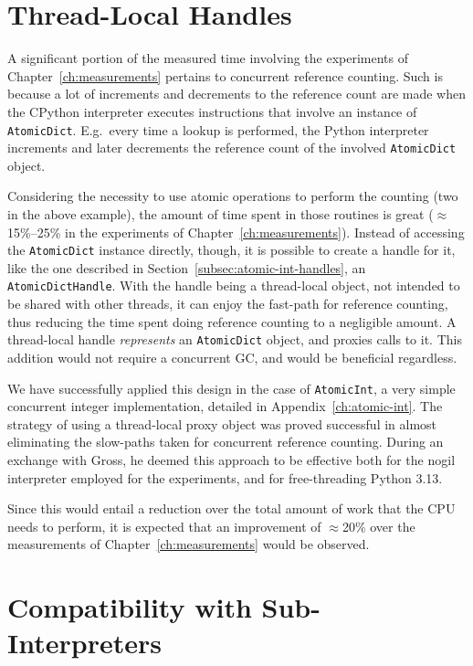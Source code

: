 \section{Thread-Local Handles}\label{sec:atomicdicthandle}

A significant portion of the measured time involving the experiments of Chapter~\ref{ch:measurements} pertains to concurrent reference counting.
Such is because a lot of increments and decrements to the reference count are made when the CPython interpreter executes instructions that involve an instance of \texttt{AtomicDict}.
E.g.\ every time a lookup is performed, the Python interpreter increments and later decrements the reference count of the involved \texttt{AtomicDict} object.

Considering the necessity to use atomic operations to perform the counting (two in the above example), the amount of time spent in those routines is great ($\approx$15\%--25\% in the experiments of Chapter~\ref{ch:measurements}).
Instead of accessing the \texttt{AtomicDict} instance directly, though, it is possible to create a handle for it, like the one described in Section~\ref{subsec:atomic-int-handles}, an \texttt{AtomicDictHandle}.
With the handle being a thread-local object, not intended to be shared with other threads, it can enjoy the fast-path for reference counting, thus reducing the time spent doing reference counting to a negligible amount.
A thread-local handle \emph{represents} an \texttt{AtomicDict} object, and proxies calls to it.
This addition would not require a concurrent GC, and would be beneficial regardless.

We have successfully applied this design in the case of \texttt{AtomicInt}, a very simple concurrent integer implementation, detailed in Appendix~\ref{ch:atomic-int}.
The strategy of using a thread-local proxy object was proved successful in almost eliminating the slow-paths taken for concurrent reference counting.
During an exchange with Gross, he deemed this approach to be effective both for the nogil interpreter employed for the experiments, and for free-threading Python 3.13.

Since this would entail a reduction over the total amount of work that the CPU needs to perform, it is expected that an improvement of $\approx$20\% over the measurements of Chapter~\ref{ch:measurements} would be observed.


\section{Compatibility with Sub-Interpreters}\label{sec:compatibility-with-sub-interpreters}

